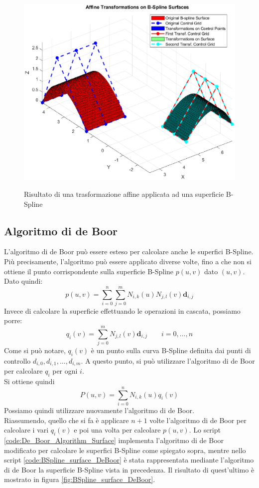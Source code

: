 \documentclass[a4paper, 12pt]{article}
\begin{document}


\begin{figure}[h!]
	\centering
	\caption{Risultato di una trasformazione affine applicata ad una superficie B-Spline}
	\includegraphics[scale=0.7]{surface_affine_trans_plot.eps}
	\label{fig:BSplineSurfaceAffineTrans}
\end{figure}

\subsection{Algoritmo di de Boor}
L'algoritmo di de Boor può essere esteso per calcolare anche le superfici B-Spline. Più precisamente,  l'algoritmo può essere applicato diverse volte, fino a che non si ottiene il punto corrispondente sulla superficie B-Spline $p(u,v)$ dato $(u,v)$. Dato quindi:
$$p(u, v) = \sum_{i = 0}^{n} \sum_{j = 0}^{m}  N_{i,k}(u)N_{j,l}(v) \mathbf{d}_{i, j} $$
Invece di calcolare la superficie effettuando le operazioni in cascata, possiamo porre:\\
$$q_i(v) = \sum_{j = 0}^{m}  N_{j,l}(v) \mathbf{d}_{i, j} \qquad i=0,\dots,n$$
Come si può notare, $q_i(v)$ è un punto sulla curva B-Spline definita dai punti di controllo $d_{i,0},d_{i,1}, \dots, d_{i,m}$.
A questo punto, si può utilizzare l'algoritmo di de Boor per calcolare $q_i$ per ogni $i$.\\
Si ottiene quindi 
$$P(u,v) = \sum_{i = 0}^{n}  N_{i,k}(u) q_i(v)$$
Possiamo quindi utilizzare nuovamente l'algoritmo di de Boor.\\
Riassumendo, quello che si fa è applicare $n+1$ volte l'algoritmo di de Boor per calcolare i vari $q_i(v)$ e poi una volta per calcolare $p(u,v)$.
Lo script \ref{code:De_Boor_Algorithm_Surface} implementa l'algoritmo di de Boor modificato per calcolare le superfici B-Spline come spiegato sopra, mentre nello script \ref{code:BSpline_surface_DeBoor} è stata rappresentata mediante l'algoritmo di de Boor la superficie B-Spline vista in precedenza. Il risultato di quest'ultimo è mostrato in figura \ref{fig:BSpline_surface_DeBoor}.
\end{document}
